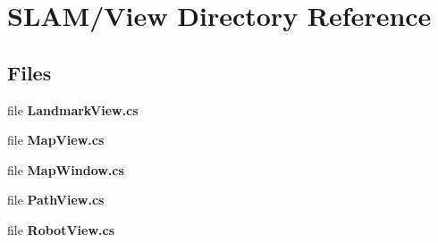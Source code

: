\section{S\-L\-A\-M/\-View Directory Reference}
\label{dir_c7ae0255942c9f627863193b7008ce23}
\subsection*{Files}
\begin{DoxyCompactItemize}
\item 
file {\bf Landmark\-View.\-cs}
\item 
file {\bf Map\-View.\-cs}
\item 
file {\bf Map\-Window.\-cs}
\item 
file {\bf Path\-View.\-cs}
\item 
file {\bf Robot\-View.\-cs}
\end{DoxyCompactItemize}
